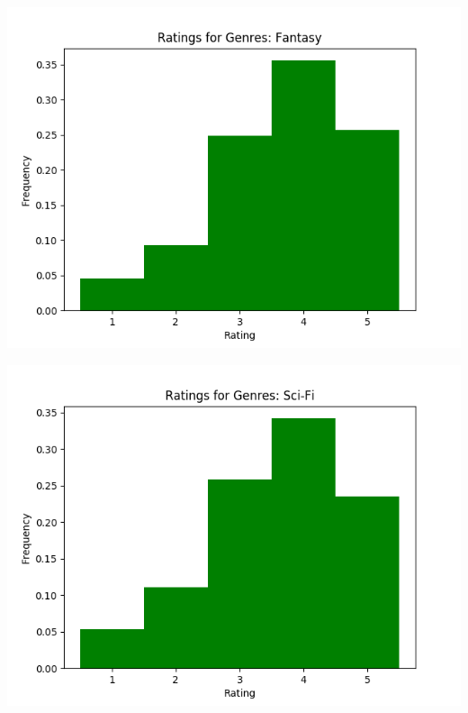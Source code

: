 \begin{appendices}
\begin{center}
\begin{minipage}{0.49\linewidth}
    \includegraphics[scale=0.5]{"Ratings for Genres: Fantasy"}
    \captionsetup{width=.75\linewidth}
  \end{minipage}
  \begin{minipage}{0.49\linewidth}
    \includegraphics[scale=0.5]{"Ratings for Genres: Sci-Fi"}
    \captionsetup{width=.75\linewidth}
  \end{minipage}
  \begin{minipage}{0.49\linewidth}

\end{minipage}
\end{center}
\end{appendices}
